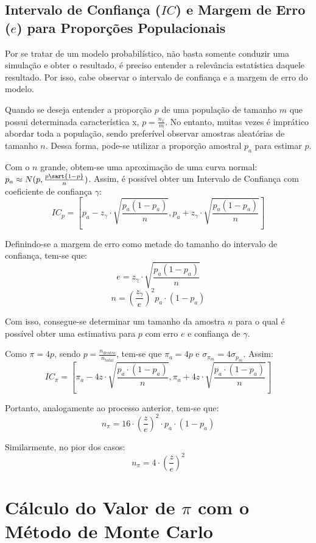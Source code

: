 \documentclass{article}
\begin{document}
\subsection{Intervalo de Confiança ($IC$) e Margem de Erro ($e$) para Proporções Populacionais}

Por se tratar de um modelo probabilístico, não basta somente conduzir uma simulação e obter o resultado, é preciso entender a relevância estatística daquele resultado. Por isso, cabe observar o intervalo de confiança e a margem de erro do modelo.

Quando se deseja entender a proporção $p$ de uma população de tamanho $m$ que possui determinada característica x, $p = \frac{n_x}{m}$. No entanto, muitas vezes é imprático abordar toda a população, sendo preferível observar amostras aleatórias de tamanho $n$. Dessa forma, pode-se utilizar a proporção amostral $p_a$ para estimar $p$.

Com o $n$ grande, obtem-se uma aproximação de uma curva normal: $p_a \approx N(p, \frac{p\sart{1-p}}{n})$. Assim, é possível obter um Intervalo de Confiança com coeficiente de confiança $\gamma$:
$$IC_p = \left[p_a - z_\gamma \cdot \sqrt{\frac{p_a (1 - p_a)}{n}}, p_a + z_\gamma \cdot \sqrt{\frac{p_a (1 - p_a)}{n}}\right]$$

Definindo-se a margem de erro como metade do tamanho do intervalo de confiança, tem-se que: $$e = z_\gamma \cdot \sqrt{\frac{p_a (1 - p_a)}{n}}$$ $$n = \left(\frac{z_\gamma}{e}\right)^{2}  p_a \cdot (1 - p_a)$$

Com isso, consegue-se determinar um tamanho da amostra $n$ para o qual é possível obter uma estimativa para $p$ com erro $e$ e confiança de $\gamma$.

Como $\pi = 4p$, sendo $p = \frac{n_{dentro}}{n_{total}}$, tem-se que $\pi_a = 4p$ e $\sigma_{\pi_m} = 4\sigma_{p_m}$. Assim:
$$IC_\pi = \left[\pi_a - 4z \cdot \sqrt{\frac{p_a \cdot (1 - p_a)}{n}}, \pi_a + 4z \cdot \sqrt{\frac{p_a \cdot (1 - p_a)}{n}}\right]$$

Portanto, analogamente ao processo anterior, tem-se que:
$$n_\pi = 16\cdot\left(\frac{z}{e}\right)^{2} \cdot p_a \cdot (1 - p_a)$$

Similarmente, no pior dos casos:
$$n_\pi=4\cdot\left(\frac{z}{e}\right)^{2}$$

\section{Cálculo do Valor de $\pi$ com o Método de Monte Carlo}
\end{document}
